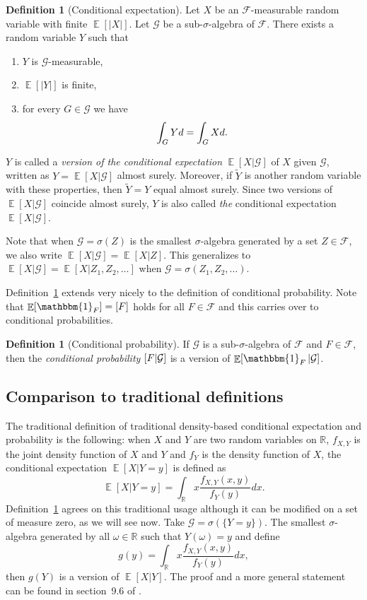 \documentclass[a4paper]{report}
\theoremstyle{plain}
\theoremstyle{definition}
\newtheorem{definition}[theorem]{Definition}
\theoremstyle{remark}
\numberwithin{equation}{chapter}
\newcommand{\R}{\mathbb{R}}
\let\P\relax
\DeclareMathOperator{\P}{\mathbb{P}}
\DeclareMathOperator{\E}{\mathbb{E}}
\DeclareMathOperator{\1}{\mathbbm{1}}
\newcommand{\F}{\mathcal{F}}
\renewcommand{\G}{\mathcal{G}}
\begin{document}
\begin{definition}[Conditional expectation]\label{def:conexp}
Let $X$ be an $\F$-measurable random variable with finite $\E[|X|]$. Let $\G$ be a sub-$\sigma$-algebra of $\F$. There exists a random variable $Y$ such that
\begin{enumerate}
\item $Y$ is $\G$-measurable,
\item $\E[|Y|]$ is finite,
\item for every $G\in\G$ we have
\begin{equation}
\int_G Yd\P=\int_G Xd\P.
\end{equation}
\end{enumerate}
$Y$ is called a \emph{version of the conditional expectation} $\E[X|\G]$ of $X$ given $\G$, written as $Y=\E[X|\G]$ almost surely. Moreover, if $\tilde{Y}$ is another random variable with these properties, then $\tilde{Y}=Y$ equal almost surely. Since two versions of $\E[X|\G]$ coincide almost surely, $Y$ is also called \emph{the} conditional expectation $\E[X|\G]$.
\end{definition}

Note that when $\G=\sigma(Z)$ is the smallest $\sigma$-algebra generated by a set $Z\in\F$, we also write $\E[X|\G]=\E[X|Z]$. This generalizes to $\E[X|\G]=\E[X|Z_1,Z_2,\ldots]$ when $\G=\sigma(Z_1,Z_2,\ldots)$.

Definition~\ref{def:conexp} extends very nicely to the definition of conditional probability. Note that $\E[\1_F]=\P[F]$ holds for all $F\in\F$ and this carries over to conditional probabilities.

\begin{definition}[Conditional probability]
If $\G$ is a sub-$\sigma$-algebra of $\F$ and $F\in\F$, then the \emph{conditional probability} $\P[F|\G]$ is a version of $\E[\1_F|\G]$.
\end{definition}

\subsection{Comparison to traditional definitions}
The traditional definition of traditional density-based conditional expectation and probability is the following: when $X$ and $Y$ are two random variables on $\R$, $f_{X,Y}$ is the joint density function of $X$ and $Y$ and $f_Y$ is the density function of $X$, the conditional expectation $\E[X|Y=y]$ is defined as
\begin{equation}
\E[X|Y=y]=\int_\R x\frac{f_{X,Y}(x,y)}{f_Y(y)}dx.
\end{equation}
Definition~\ref{def:conexp} agrees on this traditional usage although it can be modified on a set of measure zero, as we will see now. Take $\G=\sigma(\{Y=y\})$. The smallest $\sigma$-algebra generated by all $\omega\in\R$ such that $Y(\omega)=y$ and define
\begin{equation}
g(y)=\int_\R x\frac{f_{X,Y}(x,y)}{f_Y(y)}dx,
\end{equation}
then $g(Y)$ is a version of $\E[X|Y]$. The proof and a more general statement can be found in section~9.6 of \cite{Williams91}.
\end{document}
